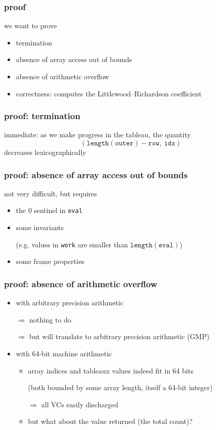 \documentclass{beamer}
\begin{document}
\begin{frame}\frametitle{proof}
  we want to prove
  \begin{itemize}
  \item termination
  \item absence of array access out of bounds
  \item absence of arithmetic overflow
  \item correctness: computes the Littlewood–Richardson coefficient
  \end{itemize}
\end{frame}

\begin{frame}\frametitle{proof: termination}
  immediate: as we make progress in the tableau, the quantity
  \begin{displaymath}
    (\mathtt{length}(\mathtt{outer}) - \mathtt{row}, ~ \mathtt{idx})
  \end{displaymath}
  decreases lexicographically
\end{frame}

\begin{frame}\frametitle{proof: absence of array access out of bounds}
  not very difficult, but requires
  \begin{itemize}
  \item the 0 sentinel in \texttt{eval} \par
  \item some invariants \par (e.g. values in \texttt{work} are smaller than
    $\mathtt{length}(\mathtt{eval})$)
  \item some frame properties
  \end{itemize}
\end{frame}

\begin{frame}\frametitle{proof: absence of arithmetic overflow}
  \begin{itemize}
  \item with arbitrary precision arithmetic \par
    $\Rightarrow$ nothing to do \par
    $\Rightarrow$ but will translate to arbitrary precision arithmetic (GMP)

  \bigskip
  \item with 64-bit machine arithmetic
    \begin{itemize}
    \item array indices and tableaux values indeed fit in 64 bits \par
      (both bounded by some array length, itself a 64-bit
      integer) \par
      $\Rightarrow$ all VCs easily discharged
    \item but what about the value returned (the total count)?
    \end{itemize}
  \end{itemize}
\end{frame}
\end{document}
